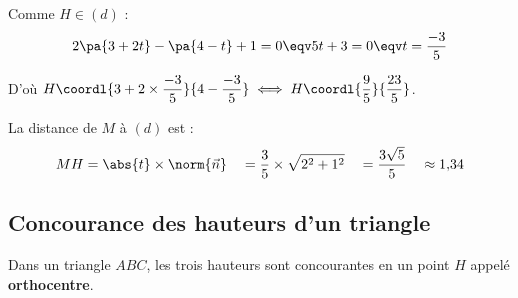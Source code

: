 \begin{methode}
\begin{correction}
		Comme $H \in (d)$ :
		\[
			2\pa{3 + 2t} - \pa{4 - t} + 1 = 0 \eqv 5t + 3 = 0 \eqv t = \dfrac{-3}{5}
		\]

		D'où $H\coordl{3+2\times\dfrac{-3}{5}}{4-\dfrac{-3}{5}} \iff H\coordl{\dfrac{9}{5}}{\dfrac{23}{5}}$.

		La distance de $M$ à $(d)$ est :
		\[
			MH = \abs{t}\times\norm{\vec{n}} \quad = \dfrac{3}{5}\times\sqrt{2^2+1^2} \quad = \dfrac{3\sqrt{5}}{5} \quad \approx 1{,}34
		\]

	\end{correction}
\end{methode}

\subsection{Concourance des hauteurs d'un triangle}

\begin{propriete}
	Dans un triangle $ABC$, les trois hauteurs sont concourantes en un point $H$ appelé \textbf{orthocentre}.
\end{propriete}

